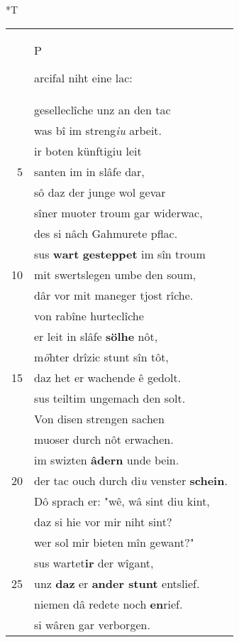 \documentclass[8pt,a4paper,notitlepage]{article}
\begin{document}
\begin{table}[ht]
\begin{minipage}[t]{0.5\linewidth}
\end{minipage}
\hspace{0.5cm}
\begin{minipage}[t]{0.5\linewidth}
\small
\begin{center}*T
\end{center}
\begin{tabular}{rl}
 & \begin{large}P\end{large}arcifal niht eine lac:\\ 
 & geselleclîche unz an den tac\\ 
 & was bî im streng\textit{iu} arbeit.\\ 
 & ir boten künftigiu leit\\ 
5 & santen im in slâfe dar,\\ 
 & sô daz der junge wol gevar\\ 
 & sîner muoter troum gar widerwac,\\ 
 & des si nâch Gahmurete pflac.\\ 
 & sus \textbf{wart} \textbf{gesteppet} im sîn troum\\ 
10 & mit swertslegen umbe den soum,\\ 
 & dâr vor mit maneger tjost rîche.\\ 
 & von rabîne hurteclîche\\ 
 & er leit in slâfe \textbf{sölhe} nôt,\\ 
 & m\textit{ö}hter drîzic stunt sîn tôt,\\ 
15 & daz het er wachende ê gedolt.\\ 
 & sus teiltim ungemach den solt.\\ 
 & Von disen strengen sachen\\ 
 & muoser durch nôt erwachen.\\ 
 & im swizten \textbf{âdern} unde bein.\\ 
20 & der tac ouch durch di\textit{u} venster \textbf{schein}.\\ 
 & Dô sprach er: "wê, wâ sint diu kint,\\ 
 & daz si hie vor mir niht sint?\\ 
 & wer sol mir bieten mîn gewant?"\\ 
 & sus wartet\textbf{ir} der wîgant,\\ 
25 & unz \textbf{daz} er \textbf{ander stunt} entslief.\\ 
 & niemen dâ redete noch \textbf{en}rief.\\ 
 & si wâren gar verborgen.\\ 

\end{tabular}
\end{minipage}
\end{table}
\end{document}
